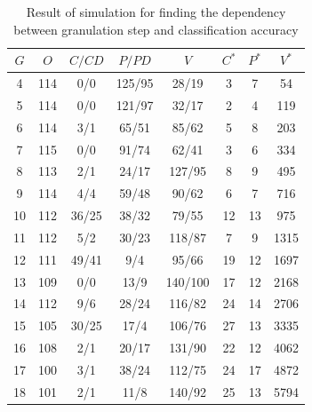 \begin{table}[H]
    \caption{Result of simulation for finding the dependency between
    granulation step and classification accuracy}
    \centering
    \begin{tabular}{|c|c|c|c|c|c|c|c|}
        \hline
        $G$ & $O$ & $C/CD$ & $P/PD$ & $V$ & $C^*$ & $P^*$ & $V^*$ \\ \hline \hline
        4&114&0/0&125/95&28/19&3&7&54 \\ \hline
        5&114&0/0&121/97&32/17&2&4&119 \\\hline
        6&114&3/1&65/51&85/62&5&8&203 \\ \hline
        7&115&0/0&91/74&62/41&3&6&334 \\ \hline
        8&113&2/1&24/17&127/95&8&9&495 \\ \hline
        9&114&4/4&59/48&90/62&6&7&716 \\ \hline
        10&112&36/25&38/32&79/55&12&13&975 \\ \hline
        11&112&5/2&30/23&118/87&7&9&1315 \\ \hline
        12&111&49/41&9/4&95/66&19&12&1697 \\ \hline
        13&109&0/0&13/9&140/100&17&12&2168 \\ \hline
        14&112&9/6&28/24&116/82&24&14&2706 \\ \hline
        15&105&30/25&17/4&106/76&27&13&3335 \\ \hline
        16&108&2/1&20/17&131/90&22&12&4062 \\ \hline
        17&100&3/1&38/24&112/75&24&17&4872 \\ \hline
        18&101&2/1&11/8&140/92&25&13&5794 \\ \hline
    \end{tabular}
    \label{tab:simulation_research_1}
\end{table}

